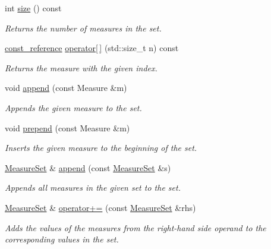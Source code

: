 \begin{DoxyCompactItemize}
int \hyperlink{structslb_1_1core_1_1sb_1_1MeasureSet_af815cec0c5431f1c96ae38e1347f2575}{size} () const 
\begin{DoxyCompactList}\small\item\em Returns the number of measures in the set. \end{DoxyCompactList}\item 
\hyperlink{structslb_1_1core_1_1sb_1_1MeasureSet_a1a3d223100e811626c1169500736808b}{const\+\_\+reference} \hyperlink{structslb_1_1core_1_1sb_1_1MeasureSet_a3c884114fa53f348ccfb8b200b45267d}{operator\mbox{[}$\,$\mbox{]}} (std\+::size\+\_\+t n) const 
\begin{DoxyCompactList}\small\item\em Returns the measure with the given index. \end{DoxyCompactList}\item 
void \hyperlink{structslb_1_1core_1_1sb_1_1MeasureSet_a45fd082014168694b96a1812c284977c}{append} (const Measure \&m)
\begin{DoxyCompactList}\small\item\em Appends the given measure to the set. \end{DoxyCompactList}\item 
void \hyperlink{structslb_1_1core_1_1sb_1_1MeasureSet_a4f88fb109179666c1d84794a4e136f38}{prepend} (const Measure \&m)
\begin{DoxyCompactList}\small\item\em Inserts the given measure to the beginning of the set. \end{DoxyCompactList}\item 
\hyperlink{structslb_1_1core_1_1sb_1_1MeasureSet}{Measure\+Set} \& \hyperlink{structslb_1_1core_1_1sb_1_1MeasureSet_a15a13fa4b1c03f616f1263bbe84d459f}{append} (const \hyperlink{structslb_1_1core_1_1sb_1_1MeasureSet}{Measure\+Set} \&s)
\begin{DoxyCompactList}\small\item\em Appends all measures in the given set to the set. \end{DoxyCompactList}\item 
\hyperlink{structslb_1_1core_1_1sb_1_1MeasureSet}{Measure\+Set} \& \hyperlink{structslb_1_1core_1_1sb_1_1MeasureSet_ac48e4d0fa78165fae58622ff042df59d}{operator+=} (const \hyperlink{structslb_1_1core_1_1sb_1_1MeasureSet}{Measure\+Set} \&rhs)
\begin{DoxyCompactList}\small\item\em Adds the values of the measures from the right-\/hand side operand to the corresponding values in the set. \end{DoxyCompactList}\item 

\end{DoxyCompactItemize}

